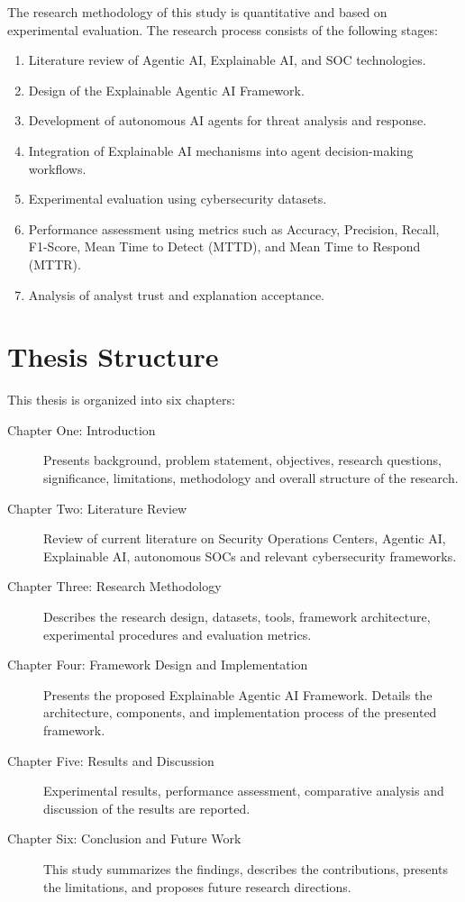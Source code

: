 \documentclass[12pt,a4paper]{report}
\begin{document}
The research methodology of this study is quantitative and based on experimental evaluation. The research process consists of the following stages:

\begin{enumerate}[label=\arabic*.]
    \item Literature review of Agentic AI, Explainable AI, and SOC technologies.
    \item Design of the Explainable Agentic AI Framework.
    \item Development of autonomous AI agents for threat analysis and response.
    \item Integration of Explainable AI mechanisms into agent decision-making workflows.
    \item Experimental evaluation using cybersecurity datasets.
    \item Performance assessment using metrics such as Accuracy, Precision, Recall, F1-Score, Mean Time to Detect (MTTD), and Mean Time to Respond (MTTR).
    \item Analysis of analyst trust and explanation acceptance.
\end{enumerate}

\section{Thesis Structure}
\label{sec:thesis_structure}

This thesis is organized into six chapters:

\begin{description}
    \item[Chapter One: Introduction] Presents background, problem statement, objectives, research questions, significance, limitations, methodology and overall structure of the research.
    \item[Chapter Two: Literature Review] Review of current literature on Security Operations Centers, Agentic AI, Explainable AI, autonomous SOCs and relevant cybersecurity frameworks.
    \item[Chapter Three: Research Methodology] Describes the research design, datasets, tools, framework architecture, experimental procedures and evaluation metrics.
    \item[Chapter Four: Framework Design and Implementation] Presents the proposed Explainable Agentic AI Framework. Details the architecture, components, and implementation process of the presented framework.
    \item[Chapter Five: Results and Discussion] Experimental results, performance assessment, comparative analysis and discussion of the results are reported.
    \item[Chapter Six: Conclusion and Future Work] This study summarizes the findings, describes the contributions, presents the limitations, and proposes future research directions.
\end{description}
\end{document}
